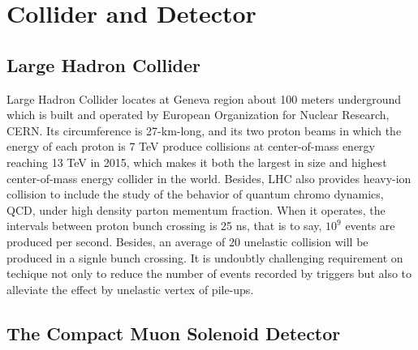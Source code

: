 
\chapter{Collider and Detector} \label{Detector}

\section{Large Hadron Collider}%
Large Hadron Collider locates at Geneva region about 100 meters underground which is built and operated by European Organization for Nuclear Research, CERN. 
Its circumference is 27-km-long, and its two proton beams in which the energy of each proton is 7 TeV produce collisions at center-of-mass energy reaching 13 TeV in 2015, 
which makes it both the largest in size and highest center-of-mass energy collider in the world.
Besides, LHC also provides heavy-ion collision to include the study of the behavior of quantum chromo dynamics, QCD, under high density parton mementum fraction. 
When it operates, the intervals between proton bunch crossing is 25 ns, that is to say,  $10^9$ events are produced per second. 
Besides, an average of 20 unelastic collision will be produced in a signle bunch crossing.
It is undoubtly challenging requirement on techique not only to reduce the number of events recorded by triggers but also to alleviate the effect by unelastic vertex of pile-ups.

\section{The Compact Muon Solenoid Detector}

